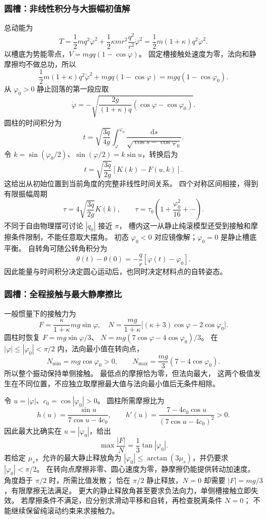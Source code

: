 \documentclass[UTF8,zihao=-4,fontset=fandol,a4paper]{ctexart}
\newcommand{\dd}{\mathrm d}
\begin{document}
\subsubsection*{圆槽：非线性积分与大振幅初值解}
总动能为
\[
T=\frac12mq^2\dot\varphi^2
+\frac12\kappa mr^2\frac{q^2}{r^2}\dot\varphi^2
=\frac12m(1+\kappa)q^2\dot\varphi^2.
\]
以槽底为势能零点，$V=mgq(1-\cos\varphi)$。
固定槽接触处速度为零，法向和静摩擦均不做总功，所以
\[
\frac12m(1+\kappa)q^2\dot\varphi^2
+mgq(1-\cos\varphi)=mgq(1-\cos\varphi_0).
\]
从 $\varphi_0>0$ 静止回落的第一段应取
\[
\dot\varphi=-\sqrt{\frac{2g}{(1+\kappa)q}
(\cos\varphi-\cos\varphi_0)}.
\]
圆柱的时间积分为
\[
t=\sqrt{\frac{3q}{4g}}
\int_{\varphi}^{\varphi_0}
\frac{\dd s}{\sqrt{\cos s-\cos\varphi_0}}.
\]
令 $k=\sin(\varphi_0/2)$、$\sin(\varphi/2)=k\sin u$，转换后为
\[
t=\sqrt{\frac{3q}{2g}}[K(k)-F(u,k)].
\]
这给出从初始位置到当前角度的完整非线性时间关系。
四个对称区间相接，得到有限振幅周期
\[
\tau=4\sqrt{\frac{3q}{2g}}K(k),\qquad
\tau=\tau_0\left(1+\frac{\varphi_0^2}{16}+\cdots\right).
\]
不同于自由物理摆可讨论 $|q_0|$ 接近 $\pi$，
槽内这一从静止纯滚模型还受到接触和摩擦条件限制，不能任意取大摆角。
初态 $\varphi_0<0$ 对应镜像解；$\varphi_0=0$ 是静止槽底平衡。
自转角可随公转角积分为
\[
\theta(t)-\theta(0)=-\frac qr[\varphi(t)-\varphi_0].
\]
因此能量与时间积分决定圆心运动后，也同时决定材料点的自转姿态。

\subsubsection*{圆槽：全程接触与最大静摩擦比}
一般惯量下的接触力为
\[
F=\frac{\kappa}{1+\kappa}mg\sin\varphi,
\quad
N=\frac{mg}{1+\kappa}
\bigl[(\kappa+3)\cos\varphi-2\cos\varphi_0\bigr].
\]
圆柱时恢复 $F=mg\sin\varphi/3$、
$N=mg(7\cos\varphi-4\cos\varphi_0)/3$。
在 $|\varphi|\le|\varphi_0|<\pi/2$ 内，法向最小值在转向点，
\[
N_{\min}=mg\cos\varphi_0>0,
\qquad
N_{\max}=\frac{mg}{3}(7-4\cos\varphi_0).
\]
所以整个振动保持单侧接触。
最低点的摩擦恰为零，但法向最大，
这两个极值发生在不同位置，不应独立取摩擦最大值与法向最小值后无条件相除。

令 $u=|\varphi|$、$c_0=\cos|\varphi_0|>0$。
圆柱所需摩擦比为
\[
h(u)=\frac{\sin u}{7\cos u-4c_0},\qquad
h'(u)=\frac{7-4c_0\cos u}{(7\cos u-4c_0)^2}>0.
\]
因此最大比确实在 $u=|\varphi_0|$，给出
\[
\max\frac{|F|}{N}=\frac13\tan|\varphi_0|.
\]
若给定 $\mu_s$，允许的最大静止释放角为
$|\varphi_0|\le\arctan(3\mu_s)$，并仍要求 $|\varphi_0|<\pi/2$。
在转向点摩擦非零、圆心速度为零，静摩擦仍能提供转动加速度。
角度趋于 $\pi/2$ 时，所需比值发散；
恰在 $\pi/2$ 静止释放，$N=0$ 却需要 $|F|=mg/3$，有限摩擦无法满足。
更大的静止释放角甚至要求负法向力，单侧槽接触立即失效。
若摩擦条件不满足，应分别求滑动平移和自转，再检查脱离条件 $N=0$；
不能继续保留纯滚动约束来求接触力。
\end{document}

